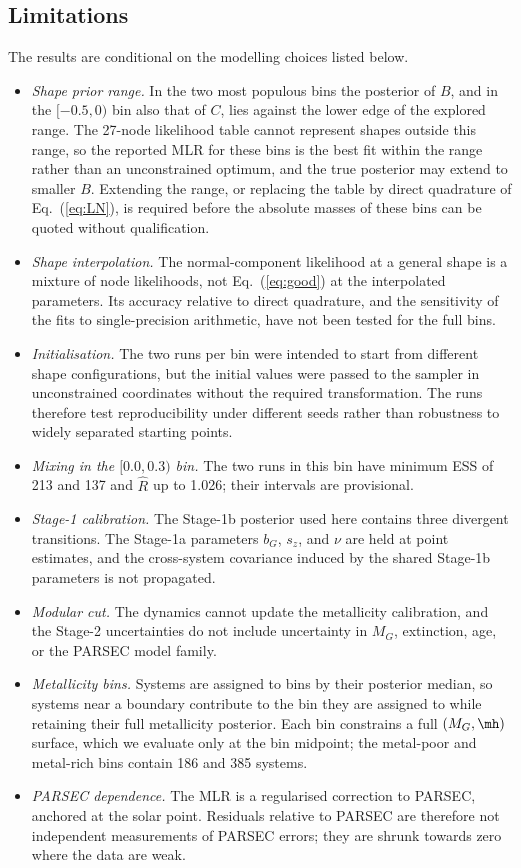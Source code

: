 \subsection{Limitations}
\label{sec:limitations}

The results are conditional on the modelling choices listed below.

\begin{itemize}
\item \emph{Shape prior range.}  In the two most populous bins the posterior
of $B$, and in the $[-0.5,0)$ bin also that of $C$, lies against the lower
edge of the explored range.  The 27-node likelihood table cannot represent
shapes outside this range, so the reported MLR for these bins is the best fit
within the range rather than an unconstrained optimum, and the true
posterior may extend to smaller $B$.  Extending the range, or replacing the
table by direct quadrature of Eq.~(\ref{eq:LN}), is required before the
absolute masses of these bins can be quoted without qualification.
\item \emph{Shape interpolation.}  The normal-component likelihood at a
general shape is a mixture of node likelihoods, not Eq.~(\ref{eq:good}) at
the interpolated parameters.  Its accuracy relative to direct quadrature,
and the sensitivity of the fits to single-precision arithmetic, have not been
tested for the full bins.
\item \emph{Initialisation.}  The two runs per bin were intended to start
from different shape configurations, but the initial values were passed to
the sampler in unconstrained coordinates without the required transformation.
The runs therefore test reproducibility under different seeds rather than
robustness to widely separated starting points.
\item \emph{Mixing in the $[0.0,0.3)$ bin.}  The two runs in this bin have
minimum ESS of 213 and 137 and $\widehat R$ up to 1.026; their intervals are
provisional.
\item \emph{Stage-1 calibration.}  The Stage-1b posterior used here
contains three divergent transitions.  The Stage-1a parameters $b_G$,
$s_z$, and $\nu$ are held at point estimates, and the cross-system
covariance induced by the shared Stage-1b parameters is not propagated.
\item \emph{Modular cut.}  The dynamics cannot update the metallicity
calibration, and the Stage-2 uncertainties do not include uncertainty in
$M_G$, extinction, age, or the PARSEC model family.
\item \emph{Metallicity bins.}  Systems are assigned to bins by their
posterior median, so systems near a boundary contribute to the bin they are
assigned to while retaining their full metallicity posterior.  Each bin
constrains a full $(M_G,\mh)$ surface, which we evaluate only at the bin
midpoint; the metal-poor and metal-rich bins contain 186 and 385 systems.
\item \emph{PARSEC dependence.}  The MLR is a regularised correction to
PARSEC, anchored at the solar point.  Residuals relative to PARSEC are
therefore not independent measurements of PARSEC errors; they are shrunk
towards zero where the data are weak.
\end{itemize}
